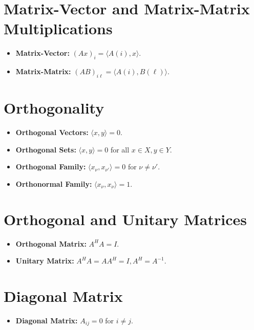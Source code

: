\documentclass{article}
\begin{document}
\section*{Matrix-Vector and Matrix-Matrix Multiplications}
\begin{itemize}
    \item \textbf{Matrix-Vector:} \( (Ax)_i = \langle A(i), x \rangle \).
    \item \textbf{Matrix-Matrix:} \( (AB)_{i\ell} = \langle A(i), B(\ell) \rangle \).
\end{itemize}

\section*{Orthogonality}
\begin{itemize}
    \item \textbf{Orthogonal Vectors:} \( \langle x, y \rangle = 0 \).
    \item \textbf{Orthogonal Sets:} \( \langle x, y \rangle = 0 \) for all \( x \in X, y \in Y \).
    \item \textbf{Orthogonal Family:} \( \langle x_\nu, x_{\nu'} \rangle = 0 \) for \( \nu \neq \nu' \).
    \item \textbf{Orthonormal Family:} \( \langle x_\nu, x_\nu \rangle = 1 \).
\end{itemize}

\section*{Orthogonal and Unitary Matrices}
\begin{itemize}
    \item \textbf{Orthogonal Matrix:} \( A^H A = I \).
    \item \textbf{Unitary Matrix:} \( A^H A = AA^H = I, A^H = A^{-1} \).
\end{itemize}

\section*{Diagonal Matrix}
\begin{itemize}
    \item \textbf{Diagonal Matrix:} \( A_{ij} = 0 \) for \( i \neq j \).
\end{itemize}
\end{document}
